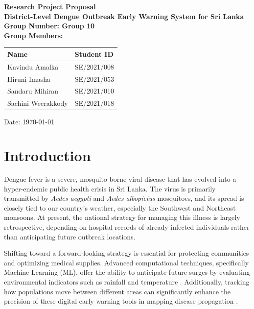 ﻿\documentclass[12pt,a4paper]{article}
\begin{document}
\begin{titlepage}
    \centering
    \vspace*{1cm}
    {\Large \textbf{Research Project Proposal}}\\[1.5cm]


    {\huge \textbf{District-Level Dengue Outbreak Early Warning System for Sri Lanka}}\\[3cm]

    \textbf{Group Number: Group 10}\\[5cm]

    {\textbf{Group Members:}}\\[0.3cm]
    \begin{table}[h]
        \centering
        \begin{tabular}{|l|l|}
            \hline
            \textbf{Name}      & \textbf{Student ID} \\ \hline
            Kavindu Amalka     & SE/2021/008         \\ \hline
            Hiruni Imasha      & SE/2021/053         \\ \hline
            Sandaru Mihiran    & SE/2021/010         \\ \hline
            Sachini Weerakkody & SE/2021/018         \\ \hline
        \end{tabular}
    \end{table}

    \vfill
    Date: \today
\end{titlepage}




\section{Introduction}

Dengue fever is a severe, mosquito-borne viral disease that has evolved into a hyper-endemic public health crisis in Sri Lanka. The virus is primarily transmitted by \textit{Aedes aegypti} and \textit{Aedes albopictus} mosquitoes, and its spread is closely tied to our country's weather, especially the Southwest and Northeast monsoons. At present, the national strategy for managing this illness is largely retrospective, depending on hospital records of already infected individuals rather than anticipating future outbreak locations.

Shifting toward a forward-looking strategy is essential for protecting communities and optimizing medical supplies. Advanced computational techniques, specifically Machine Learning (ML), offer the ability to anticipate future surges by evaluating environmental indicators such as rainfall and temperature \parencite{uduwanage2025}. Additionally, tracking how populations move between different areas can significantly enhance the precision of these digital early warning tools in mapping disease propagation \parencite{chen2026}.
\end{document}
